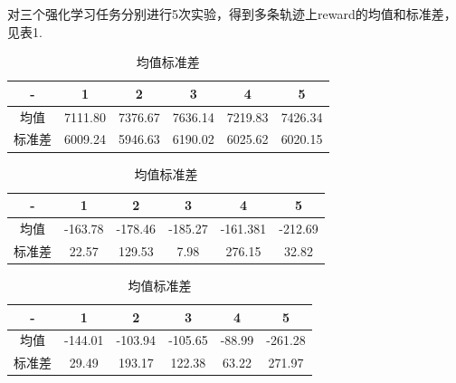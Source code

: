\documentclass[a4paper,UTF8]{article}
\theoremstyle{definition}
\begin{document}
对三个强化学习任务分别进行5次实验，得到多条轨迹上reward的均值和标准差，见表1.
\begin{table}[!htbp]
	\centering
	\caption{均值标准差}
	\begin{tabular}{|c|c|c|c|c|c|}
	
		\hline
		
		\hline
		
		- & 1 & 2 & 3 & 4 & 5 \\
		
		\hline
		
		均值 & 7111.80 & 7376.67 & 7636.14 & 7219.83 & 7426.34\\

		\hline

		标准差 & 6009.24 & 5946.63 & 6190.02 & 6025.62 & 6020.15\\
		
		\hline
	
	\end{tabular}

	\begin{tabular}{|c|c|c|c|c|c|}
	
		\hline
		
		\hline
		
		- & 1 & 2 & 3 & 4 & 5 \\
		
		\hline
		
		均值 & -163.78 & -178.46 & -185.27 & -161.381 & -212.69\\

		\hline

		标准差 & 22.57 & 129.53 & 7.98 & 276.15 & 32.82\\
		
		\hline
	
	\end{tabular}

	\begin{tabular}{|c|c|c|c|c|c|}
	
		\hline
		
		\hline
		
		- & 1 & 2 & 3 & 4 & 5 \\
		
		\hline
		
		均值 & -144.01 & -103.94 & -105.65 & -88.99 & -261.28\\

		\hline

		标准差 & 29.49 & 193.17 & 122.38 & 63.22 & 271.97\\
		
		\hline
	
	\end{tabular}
\end{table}
\end{document}
